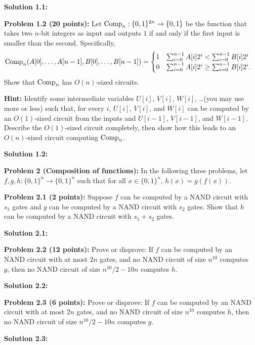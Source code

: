 \documentclass[11pt]{article}
\begin{document}
\textbf{Solution 1.1:} %

\textbf{Problem 1.2 (20 points):} Let $\mathrm{Comp}_n:\{0,1\}^{2n} \to \{0,1\}$ be the function that takes two $n$-bit integers as input and outputs $1$ if and only if  the first input is smaller than the second. Specifically,
$$\mathrm{Comp}_n(A[0], \ldots, A[n-1], B[0], \ldots, B[n-1]) = 
\begin{cases}
1 & \sum_{i=0}^{n-1} A[i]2^i < \sum_{i=0}^{n-1} B[i]2^i\\
0 & \sum_{i=0}^{n-1} A[i]2^i \ge \sum_{i=0}^{n-1} B[i]2^i.
\end{cases}$$
 Show that $\mathrm{Comp}_n$ has $O(n)$-sized circuits. 

{\bf Hint: } Identify some intermediate variables $U[i]$, $V[i]$, $W[i]$, \ldots (you may use more or less) such that, for every $i$, $U[i]$, $V[i]$, and $W[i]$ can be computed by an $O(1)$-sized circuit from the inputs and $U[i-1]$, $V[i-1]$, and $W[i-1]$. Describe the $O(1)$-sized circuit completely, then show how this leads to an $O(n)$-sized circuit computing $\mathrm{Comp}_n$.

\textbf{Solution 1.2:} %

\textbf{Problem 2 (Composition of functions):} In the following three problems, let $f,g,h:\{0,1\}^n \to\{0,1\}^n$ such that for all $x \in \{0,1\}^n$, $h(x) = g(f(x))$. 

\textbf{Problem 2.1 (2 points):} Suppose $f$ can be computed by a NAND circuit with $s_1$ gates and $g$ can be computed by a NAND circuit with $s_2$ gates. Show that $h$ can be computed by a NAND circuit with $s_1 + s_2$ gates. 

\textbf{Solution 2.1:} %

\textbf{Problem 2.2 (12 points):} Prove or disprove: If $f$ can be computed by an  NAND circuit with at most $2n$ gates, and no NAND circuit of size $n^{10}$ computes $g$, then no NAND circuit of size $n^{10}/2-10n$ computes $h$. 

\textbf{Solution 2.2:} %

\textbf{Problem 2.3 (6 points):} Prove or disprove: If $f$ can be computed by an  NAND circuit with at most $2n$ gates, and no NAND circuit of size $n^{10}$ computes $h$, then no NAND circuit of size $n^{10}/2-10n$ computes $g$. 


\textbf{Solution 2.3:} %


\newcommand{\Blah}{\mathrm{Blah}}
\newcommand{\Zero}{\mathbf{0}}
\newcommand{\One}{\mathbf{1}}
\end{document}
